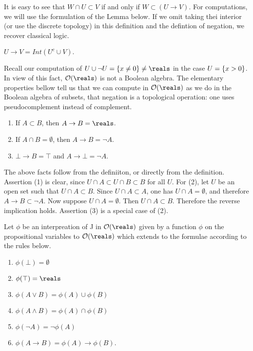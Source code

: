 It is easy to see that $W \cap U \subset V$ if and only if $W \subset (U \to V)$.  For computations, we will use the formulation of the Lemma below.  If we omit taking thei interior  (or use the discrete topology) in this definition and the defintion of negation, we recover classical logic.

\begin{lemma}
$U \to V = Int(U^c \cup V)$.
\end{lemma}

Recall our computation of $U \cup \neg U = \set{ x \ne 0 } \ne \reals$ in the case $U = \{  x > 0 \}$.  In view of this fact, $\opensets(\reals)$ is not a Boolean algebra.
The elementary properties bellow tell us that we can compute in $\opensets(\reals)$ as we do in the Boolean algebra of subsets,  that negation is a topological operation: one uses pseudocomplement instead of complement.



\begin{enumerate}

\item  If $A \subset B$, then $A \to B = \reals$.

\item If $A \cap B = \emptyset$, then $A \to B = \neg A$.

\item $\bot \to B = \top$ and $A \to \bot = \neg A$.

\end{enumerate}

The above facts follow from the definiiton, or directly from the definition.  Assertion (1) is clear, since $U \cap A \subset U \cap B \subset B$ for all $U$.  For (2), let $U$ be an open set such that $U \cap A \subset B$.  Since $U \cap A \subset A$, one has $U \cap A = \emptyset$, and therefore $A \to B \subset \neg A$.
Now suppose $U \cap A = \emptyset$.  Then $U \cap A \subset B$.  Therefore the reverse implication holds.  Assertion (3) is a special case of (2).


Let $\phi$ be an interpreation of J in $\opensets(\reals)$ given by a function $\phi$ on the propositional variables to $\opensets(\reals)$ which extends to the formulae according to the
rules below.

\begin{enumerate}

\item $\phi(\bot) = \emptyset$

\item $\phi(\top) = \reals$

\item $\phi(A \lor B) = \phi(A) \cup \phi(B)$

\item $\phi(A \land B) = \phi(A) \cap \phi(B)$

\item $\phi(\neg A) = \neg \phi(A)$

\item $\phi(A \to B) = \phi(A) \to \phi(B)$.

\end{enumerate}

